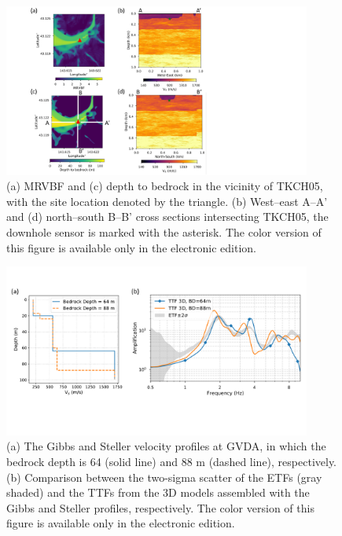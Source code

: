 \clearpage
\begin{figure}[!ht]
  \centering
  \includegraphics[width=0.9\textwidth]{figures/figure_etf_8.pdf}
  \caption{(a) MRVBF and (c) depth to bedrock in the vicinity of TKCH05, with the site location denoted by the triangle. (b) West–east A–A' and (d) north–south B–B' cross sections intersecting TKCH05, the downhole sensor is marked with the asterisk. The color version of this figure is available only in the electronic edition.}
  \label{fig:etf-8}
\end{figure}

\clearpage
\begin{figure}[!ht]
  \centering
  \includegraphics[width=0.9\textwidth]{figures/figure_etf_9.pdf}
  \caption{(a) The Gibbs and Steller velocity profiles at GVDA, in which the bedrock depth is 64 (solid line) and 88 m (dashed line), respectively. (b) Comparison between the two-sigma scatter of the ETFs (gray shaded) and the TTFs from the 3D models assembled with the Gibbs and Steller profiles, respectively. The color version of this figure is available only in the electronic edition.}
  \label{fig:etf-9}
\end{figure}

